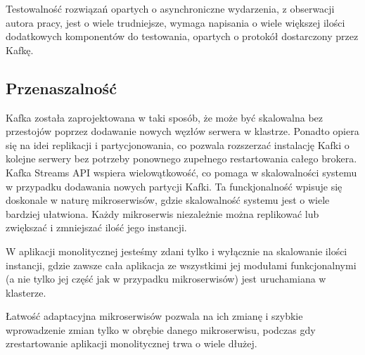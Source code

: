 Testowalność rozwiązań opartych o asynchroniczne wydarzenia, z obserwacji autora pracy, jest o wiele trudniejsze, wymaga napisania o wiele większej ilości dodatkowych komponentów do testowania, opartych o protokół dostarczony przez Kafkę.

\subsection{Przenaszalność}
Kafka została zaprojektowana w taki sposób, że może być skalowalna bez przestojów poprzez dodawanie nowych węzłów serwera w klastrze. Ponadto opiera się na idei replikacji i partycjonowania, co pozwala rozszerzać instalację Kafki o kolejne serwery bez potrzeby ponownego zupełnego restartowania całego brokera. Kafka Streams API wspiera wielowątkowość, co pomaga w skalowalności systemu w przypadku dodawania nowych partycji Kafki. Ta funckjonalność wpisuje się doskonale w naturę mikroserwisów, gdzie skalowalność systemu jest o wiele bardziej ułatwiona. Każdy mikroserwis niezależnie można replikować lub zwiększać i zmniejszać ilość jego instancji. 

W aplikacji monolitycznej jesteśmy zdani tylko i wyłącznie na skalowanie ilości instancji, gdzie zawsze cała aplikacja ze wszystkimi jej modułami funkcjonalnymi (a nie tylko jej część jak w przypadku mikroserwisów) jest uruchamiana w klasterze.

Łatwość adaptacyjna mikroserwisów pozwala na ich zmianę i szybkie wprowadzenie zmian tylko w obrębie danego mikroserwisu, podczas gdy zrestartowanie aplikacji monolitycznej trwa o wiele dłużej.
